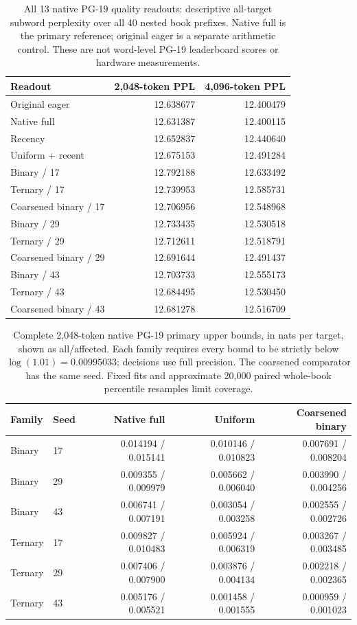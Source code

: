 \documentclass[11pt]{article}
\begin{document}
\begin{table}[htbp]
\centering\small
\begin{tabular}{lrr}
\toprule
Readout & 2,048-token PPL & 4,096-token PPL \\
\midrule
Original eager & 12.638677 & 12.400479 \\
Native full & 12.631387 & 12.400115 \\
Recency & 12.652837 & 12.440640 \\
Uniform + recent & 12.675153 & 12.491284 \\
Binary / 17 & 12.792188 & 12.633492 \\
Ternary / 17 & 12.739953 & 12.585731 \\
Coarsened binary / 17 & 12.706956 & 12.548968 \\
Binary / 29 & 12.733435 & 12.530518 \\
Ternary / 29 & 12.712611 & 12.518791 \\
Coarsened binary / 29 & 12.691644 & 12.491437 \\
Binary / 43 & 12.703733 & 12.555173 \\
Ternary / 43 & 12.684495 & 12.530450 \\
Coarsened binary / 43 & 12.681278 & 12.516709 \\
\bottomrule
\end{tabular}
\caption{All 13 native PG-19 quality readouts: descriptive all-target
subword perplexity over all 40 nested book prefixes. Native full is the
primary reference; original eager is a separate arithmetic control.
These are not word-level PG-19 leaderboard scores or hardware measurements.}
\label{tab:native-pg19-absolute}
\end{table}

\begin{table}[htbp]
\centering\small
\begin{tabular}{llrrr}
\toprule
Family & Seed & Native full & Uniform & Coarsened binary \\
\midrule
Binary & 17 & 0.014194 / 0.015141 & 0.010146 / 0.010823 & 0.007691 / 0.008204 \\
Binary & 29 & 0.009355 / 0.009979 & 0.005662 / 0.006040 & 0.003990 / 0.004256 \\
Binary & 43 & 0.006741 / 0.007191 & 0.003054 / 0.003258 & 0.002555 / 0.002726 \\
Ternary & 17 & 0.009827 / 0.010483 & 0.005924 / 0.006319 & 0.003267 / 0.003485 \\
Ternary & 29 & 0.007406 / 0.007900 & 0.003876 / 0.004134 & 0.002218 / 0.002365 \\
Ternary & 43 & 0.005176 / 0.005521 & 0.001458 / 0.001555 & 0.000959 / 0.001023 \\
\bottomrule
\end{tabular}
\caption{Complete 2,048-token native PG-19 primary upper bounds,
in nats per target, shown as all/affected. Each family requires every bound
to be strictly below \(\log(1.01)=0.00995033\); decisions use full precision.
The coarsened comparator has the same seed. Fixed fits and approximate
20,000 paired whole-book percentile resamples limit coverage.}
\label{tab:native-pg19-2048}
\end{table}
\end{document}
